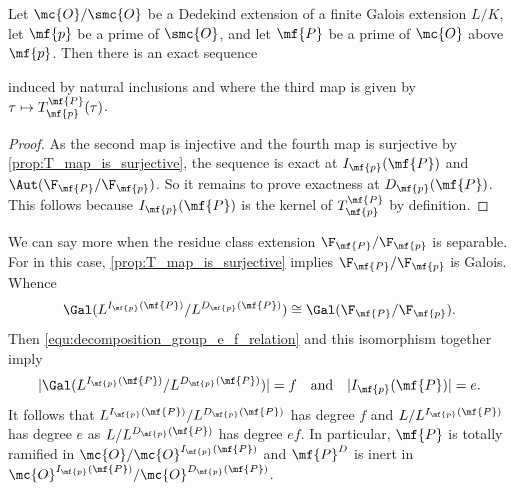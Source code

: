     \begin{proposition}\label{prop:inertia_group_exact_sequence}
      Let \(\mc{O}/\smc{O}\) be a Dedekind extension of a finite Galois extension \(L/K\), let \(\mf{p}\) be a prime of \(\smc{O}\), and let \(\mf{P}\) be a prime of \(\mc{O}\) above \(\mf{p}\). Then there is an exact sequence
      \begin{center}
      \end{center}
      induced by natural inclusions and where the third map is given by \(\tau \mapsto T_{\mf{p}}^{\mf{P}}(\tau)\).
    \end{proposition}
    \begin{proof}
      As the second map is injective and the fourth map is surjective by \cref{prop:T_map_is_surjective}, the sequence is exact at \(I_{\mf{p}}(\mf{P})\) and \(\Aut(\F_{\mf{P}}/\F_{\mf{p}})\). So it remains to prove exactness at \(D_{\mf{p}}(\mf{P})\). This follows because \(I_{\mf{p}}(\mf{P})\) is the kernel of \(T_{\mf{p}}^{\mf{P}}\) by definition.
    \end{proof}

    We can say more when the residue class extension \(\F_{\mf{P}}/\F_{\mf{p}}\) is separable. For in this case, \cref{prop:T_map_is_surjective} implies \(\F_{\mf{P}}/\F_{\mf{p}}\) is Galois. Whence
    \[
      \Gal(L^{I_{\mf{p}}(\mf{P})}/L^{D_{\mf{p}}(\mf{P})}) \cong \Gal(\F_{\mf{P}}/\F_{\mf{p}}).
    \]
    Then \cref{equ:decomposition_group_e_f_relation} and this isomorphism together imply 
    \[
      |\Gal(L^{I_{\mf{p}}(\mf{P})}/L^{D_{\mf{p}}(\mf{P})})| = f \quad \text{and} \quad |I_{\mf{p}}(\mf{P})| = e.
    \]
    It follows that \(L^{I_{\mf{p}}(\mf{P})}/L^{D_{\mf{p}}(\mf{P})}\) has degree \(f\) and \(L/L^{I_{\mf{p}}(\mf{P})}\) has degree \(e\) as \(L/L^{D_{\mf{p}}(\mf{P})}\) has degree \(ef\). In particular, \(\mf{P}\) is totally ramified in \(\mc{O}/\mc{O}^{I_{\mf{p}}(\mf{P})}\) and \(\mf{P}^{D}\) is inert in \(\mc{O}^{I_{\mf{p}}(\mf{P})}/\mc{O}^{D_{\mf{p}}(\mf{P})}\).

